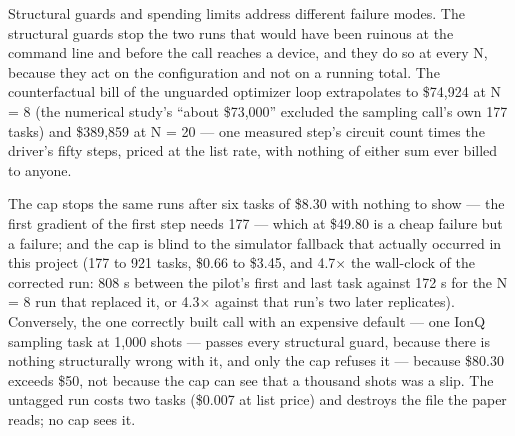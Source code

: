 \documentclass[acmsmall,screen,review]{acmart}
\begin{document}
Structural guards and spending limits address different failure modes. The structural guards stop the two runs that would have been ruinous at the command line and before the call reaches a device, and they do so at every N, because they act on the configuration and not on a running total. The counterfactual bill of the unguarded optimizer loop extrapolates to \$74,924 at N = 8 (the numerical study's ``about \$73,000'' excluded the sampling call's own 177 tasks) and \$389,859 at N = 20 --- one measured step's circuit count times the driver's fifty steps, priced at the list rate, with nothing of either sum ever billed to anyone.


The cap stops the same runs after six tasks of \$8.30 with nothing to show --- the first gradient of the first step needs 177 --- which at \$49.80 is a cheap failure but a failure; and the cap is blind to the simulator fallback that actually occurred in this project (177 to 921 tasks, \$0.66 to \$3.45, and 4.7$\times$ the wall-clock of the corrected run: 808 s between the pilot's first and last task against 172 s for the N = 8 run that replaced it, or 4.3$\times$ against that run's two later replicates). Conversely, the one correctly built call with an expensive default --- one IonQ sampling task at 1,000 shots --- passes every structural guard, because there is nothing structurally wrong with it, and only the cap refuses it --- because \$80.30 exceeds \$50, not because the cap can see that a thousand shots was a slip. The untagged run costs two tasks (\$0.007 at list price) and destroys the file the paper reads; no cap sees it.
\end{document}
